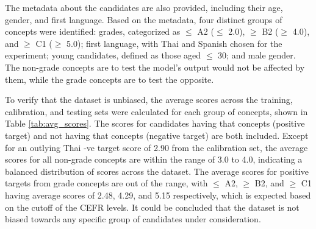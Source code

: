 The metadata about the candidates are also provided, including their age, gender, and first language. Based on the metadata, four distinct groups of concepts were identified: grades, categorized as $\leq$ A2 ($\leq$ 2.0), $\geq$ B2 ($\geq$ 4.0), and $\geq$ C1 ($\geq$ 5.0); first language, with Thai and Spanish chosen for the experiment; young candidates, defined as those aged $\leq$ 30; and male gender. The non-grade concepts are to test the model's output would not be affected by them, while the grade concepts are to test the opposite.

To verify that the dataset is unbiased, the average scores across the training, calibration, and testing sets were calculated for each group of concepts, shown in Table \ref{tab:avg_scores}. The scores for candidates having that concepts (positive target) and not having that concepts (negative target) are both included. Except for an outlying Thai -ve target score of 2.90 from the calibration set, the average scores for all non-grade concepts are within the range of 3.0 to 4.0, indicating a balanced distribution of scores across the dataset. The average scores for positive targets from grade concepts are out of the range, with $\leq$ A2, $\geq$ B2, and $\geq$ C1 having average scores of 2.48, 4.29, and 5.15 respectively, which is expected based on the cutoff of the CEFR levels. It could be concluded that the dataset is not biased towards any specific group of candidates under consideration.

